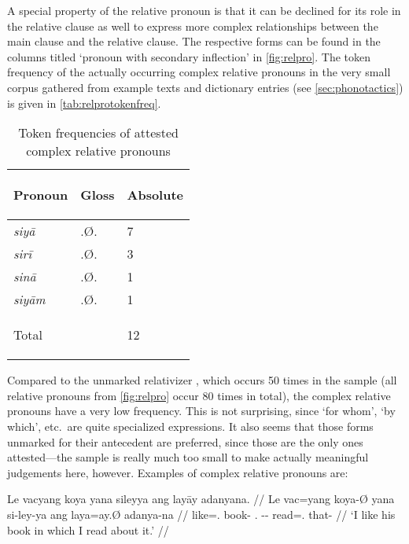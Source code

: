 A special property of the relative pronoun is that it can be declined for its 
role in the relative clause as well to express more complex relationships 
between the main clause and the relative clause. The respective forms can be 
found in the columns titled `pronoun with secondary inflection' in 
\autoref{fig:relpro}. The token frequency of the actually occurring complex 
relative pronouns in the very small corpus gathered from example texts and 
dictionary entries (see \autoref{sec:phonotactics}) is given in 
\autoref{tab:relprotokenfreq}.

\begin{table}[tp]\centering
\caption{Token frequencies of attested complex relative pronouns}

\begin{tabu} to .75
\tableheaderfont\toprule

Pronoun & Gloss & Absolute \\

\toprule

siyā	& \Rel{}.Ø.\Loc{} & 7 \\
sirī	& \Rel{}.Ø.\Ins{} & 3 \\
sinā	& \Rel{}.Ø.\Gen{} & 1 \\
siyām	& \Rel{}.Ø.\Dat{} & 1 \\

\bottomrule

\textup{Total}	& & 12 \\

\bottomrule
\end{tabu}
\label{tab:relprotokenfreq}
\end{table}

Compared to the unmarked relativizer , which occurs 50 times in 
the sample (all relative pronouns from \autoref{fig:relpro} occur 80 times in 
total), the complex relative pronouns have a very low frequency. This is not 
surprising, since `for whom', `by which', etc.\ are quite specialized 
expressions. It also seems that those forms unmarked for their antecedent are 
preferred, since those are the only ones attested---the sample is really much 
too small to make actually meaningful judgements here, however. Examples of 
complex relative pronouns are:

\pex
\a\begingl[glspace=.33em]
	\gla Le vacyang koya yana sileyya ang layāy adanyana. //
	\glb Le vac=yang koya-Ø yana si-ley-ya ang laya=ay.Ø adanya-na //
	\glc \PatTI{} like=\Fsg{}.\Aarg{} book-\Top{} \TsgM{}.\Gen{} 
		\Rel{}-\PargI{}-\Loc{} \Aarg{} read=\Fsg{}.\Top{} that-\Gen{} //
	\glft `I like his book in which I read about it.' //
\endgl

